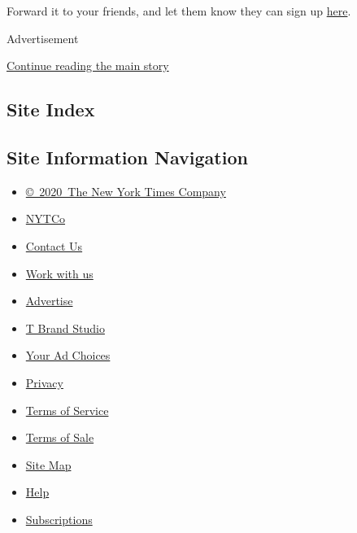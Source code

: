 Forward it to your friends, and let them know they can sign up
\href{https://www.nytimes3xbfgragh.onion/newsletters/canada-letter?smid=nytemail\&smvar=canadaletter\&te=1\&nl=canada-today\&emc=edit_cnda_20190622}{here}.

Advertisement

\protect\hyperlink{after-bottom}{Continue reading the main story}

\hypertarget{site-index}{%
\subsection{Site Index}\label{site-index}}

\hypertarget{site-information-navigation}{%
\subsection{Site Information
Navigation}\label{site-information-navigation}}

\begin{itemize}
\tightlist
\item
  \href{https://help.nytimes3xbfgragh.onion/hc/en-us/articles/115014792127-Copyright-notice}{©~2020~The
  New York Times Company}
\end{itemize}

\begin{itemize}
\tightlist
\item
  \href{https://www.nytco.com/}{NYTCo}
\item
  \href{https://help.nytimes3xbfgragh.onion/hc/en-us/articles/115015385887-Contact-Us}{Contact
  Us}
\item
  \href{https://www.nytco.com/careers/}{Work with us}
\item
  \href{https://nytmediakit.com/}{Advertise}
\item
  \href{http://www.tbrandstudio.com/}{T Brand Studio}
\item
  \href{https://www.nytimes3xbfgragh.onion/privacy/cookie-policy\#how-do-i-manage-trackers}{Your
  Ad Choices}
\item
  \href{https://www.nytimes3xbfgragh.onion/privacy}{Privacy}
\item
  \href{https://help.nytimes3xbfgragh.onion/hc/en-us/articles/115014893428-Terms-of-service}{Terms
  of Service}
\item
  \href{https://help.nytimes3xbfgragh.onion/hc/en-us/articles/115014893968-Terms-of-sale}{Terms
  of Sale}
\item
  \href{https://spiderbites.nytimes3xbfgragh.onion}{Site Map}
\item
  \href{https://help.nytimes3xbfgragh.onion/hc/en-us}{Help}
\item
  \href{https://www.nytimes3xbfgragh.onion/subscription?campaignId=37WXW}{Subscriptions}
\end{itemize}
